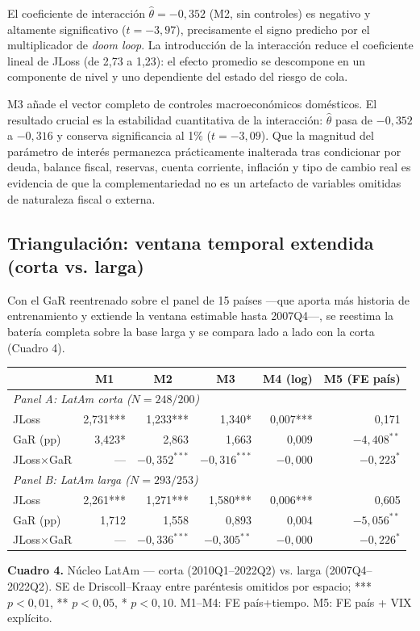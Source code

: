 \documentclass[5p,times,twocolumn,authoryear]{elsarticle}
\begin{document}
El coeficiente de interacción $\hat\theta=-0{,}352$ (M2, sin controles) es negativo y altamente significativo ($t=-3{,}97$), precisamente el signo predicho por el multiplicador de \textit{doom loop}. La introducción de la interacción reduce el coeficiente lineal de JLoss (de 2,73 a 1,23): el efecto promedio se descompone en un componente de nivel y uno dependiente del estado del riesgo de cola.

M3 añade el vector completo de controles macroeconómicos domésticos. El resultado crucial es la estabilidad cuantitativa de la interacción: $\hat\theta$ pasa de $-0{,}352$ a $-0{,}316$ y conserva significancia al 1\% ($t=-3{,}09$). Que la magnitud del parámetro de interés permanezca prácticamente inalterada tras condicionar por deuda, balance fiscal, reservas, cuenta corriente, inflación y tipo de cambio real es evidencia de que la complementariedad no es un artefacto de variables omitidas de naturaleza fiscal o externa.

\subsection{Triangulación: ventana temporal extendida (corta vs. larga)}

Con el GaR reentrenado sobre el panel de 15 países —que aporta más historia de entrenamiento y extiende la ventana estimable hasta 2007Q4—, se reestima la batería completa sobre la base larga y se compara lado a lado con la corta (Cuadro 4).

\begin{table}[t]
\centering
\small
\begin{tabular}{lrrrrr}
\toprule
 & \multicolumn{1}{c}{M1} & \multicolumn{1}{c}{M2} & \multicolumn{1}{c}{M3} & \multicolumn{1}{c}{M4 (log)} & \multicolumn{1}{c}{M5 (FE país)} \\
\midrule
\multicolumn{6}{l}{\textit{Panel A: LatAm corta ($N=248/200$)}} \\
JLoss        & 2,731*** & 1,233*** & 1,340* & 0,007*** & 0,171 \\
GaR (pp)     & 3,423*   & 2,863    & 1,663  & 0,009    & $-4,408^{**}$ \\
JLoss$\times$GaR & — & $-0,352^{***}$ & $-0,316^{***}$ & $-0,000$ & $-0,223^{*}$ \\
\midrule
\multicolumn{6}{l}{\textit{Panel B: LatAm larga ($N=293/253$)}} \\
JLoss        & 2,261*** & 1,271*** & 1,580*** & 0,006*** & 0,605 \\
GaR (pp)     & 1,712    & 1,558    & 0,893    & 0,004    & $-5,056^{**}$ \\
JLoss$\times$GaR & — & $-0,336^{***}$ & $-0,305^{**}$ & $-0,000$ & $-0,226^{*}$ \\
\bottomrule
\end{tabular}
\smallskip
\small\textbf{Cuadro 4.} Núcleo LatAm — corta (2010Q1–2022Q2) vs. larga (2007Q4–2022Q2). SE de Driscoll–Kraay entre paréntesis omitidos por espacio; *** $p<0{,}01$, ** $p<0{,}05$, * $p<0{,}10$. M1–M4: FE país+tiempo. M5: FE país + VIX explícito.
\end{table}
\end{document}
